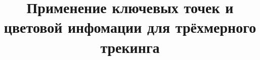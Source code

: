 \documentclass[a4paper, 14pt]{article}
\title{
    Применение ключевых точек и цветовой инфомации для трёхмерного трекинга
}
\begin{document}
\maketitle

\pagebreak
\tableofcontents
\newpage








\newpage


\end{document}
